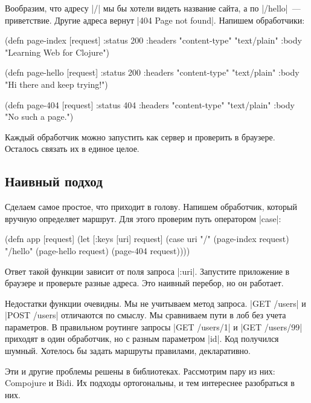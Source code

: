Вообразим, что адресу \spverb|/| мы бы хотели видеть название сайта, а по
\spverb|/hello|~--- приветствие. Другие адреса вернут \spverb|404 Page not found|.
Напишем обработчики:

\begin{english}
  \begin{clojure}
(defn page-index [request]
  {:status 200
   :headers {"content-type" "text/plain"}
   :body "Learning Web for Clojure"})

(defn page-hello [request]
  {:status 200
   :headers {"content-type" "text/plain"}
   :body "Hi there and keep trying!"})

(defn page-404 [request]
  {:status 404
   :headers {"content-type" "text/plain"}
   :body "No such a page."})
  \end{clojure}
\end{english}

Каждый обработчик можно запустить как сервер и проверить в браузере. Осталось
связать их в единое целое.

\subsection{Наивный подход}

Сделаем самое простое, что приходит в голову. Напишем обработчик, который
вручную определяет маршрут. Для этого проверим путь оператором \spverb|case|:

\begin{english}
  \begin{clojure}
(defn app [request]
  (let [{:keys [uri]} request]
    (case uri
      "/"      (page-index request)
      "/hello" (page-hello request)
      (page-404 request))))
  \end{clojure}
\end{english}

Ответ такой функции зависит от поля запроса \spverb|:uri|. Запустите приложение
в браузере и проверьте разные адреса. Это наивный перебор, но он работает.

Недостатки функции очевидны. Мы не учитываем метод запроса. \spverb|GET /users|
и \spverb|POST /users| отличаются по смыслу. Мы сравниваем пути в лоб без учета
параметров. В правильном роутинге запросы \spverb|GET /users/1| и \spverb|GET /users/99|
приходят в один обработчик, но с разным параметром \spverb|id|. Код
получился шумный. Хотелось бы задать маршруты правилами, декларативно.

Эти и другие проблемы решены в библиотеках. Рассмотрим пару из них: Compojure и
Bidi. Их подходы ортогональны, и тем интереснее разобраться в них.

